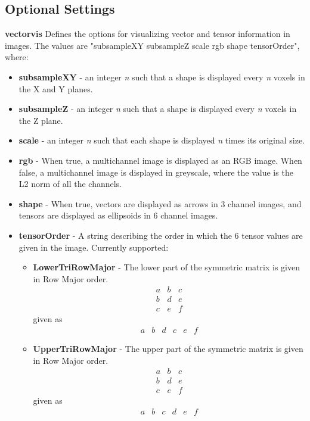 \documentclass{article}
\newenvironment{componentoption}[1]%
{\textbf{#1}\newline}
{\newline}
\begin{document}
\subsection{Optional Settings}

\begin{componentoption}{vectorvis}
Defines the options for visualizing vector and tensor information in images. The values are "subsampleXY subsampleZ scale rgb shape tensorOrder", where:
\begin{itemize}
	\item \textbf{subsampleXY} - an integer \textit{n} such that a shape is displayed every \textit{n} voxels in the X and Y planes.
	\item \textbf{subsampleZ} - an integer \textit{n} such that a shape is displayed every \textit{n} voxels in the Z plane.
	\item \textbf{scale} - an integer \textit{n} such that each shape is displayed \textit{n} times its original size.
	\item \textbf{rgb} - When true, a multichannel image is displayed as an RGB image. When false, a multichannel image is displayed in greyscale, where the value is the L2 norm of all the channels.
	\item \textbf{shape} - When true, vectors are displayed as arrows in 3 channel images, and tensors are displayed as ellipsoids in 6 channel images.
	\item \textbf{tensorOrder} - A string describing the order in which the 6 tensor values are given in the image. Currently supported:
	\begin{itemize}
		\item \textbf{LowerTriRowMajor} - The lower part of the symmetric matrix is given in Row Major order.
\[	 
		\begin{matrix}
			a & b & c \\
			b & d & e \\
			c & e & f 
		\end{matrix}
\]
		given as
\[
		\begin{array} {cccccc}
		a & b & d & c & e & f 
		\end{array}
\]
		\item \textbf{UpperTriRowMajor} - The upper part of the symmetric matrix is given in Row Major order.
\[	 
		\begin{matrix}
			a & b & c \\
			b & d & e \\
			c & e & f 
		\end{matrix}
\]
		given as
\[
		\begin{array} {cccccc}
		a & b & c & d & e & f
		\end{array}
\]


\end{itemize}
\end{itemize}
\end{componentoption}
\end{document}
